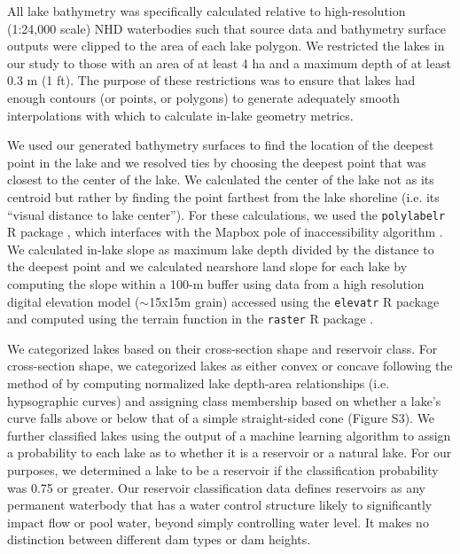 \documentclass[draft]{agujournal2019}
\begin{document}
All lake bathymetry was specifically calculated relative to high-resolution (1:24,000 scale) NHD \cite{usgsNationalHydrographyDataset2019} waterbodies such that source data and bathymetry surface outputs were clipped to the area of each lake polygon. We restricted the lakes in our study to those with an area of at least 4 ha and a maximum depth of at least 0.3 m (1 ft). The purpose of these restrictions was to ensure that lakes had enough contours (or points, or polygons) to generate adequately smooth interpolations with which to calculate in-lake geometry metrics.

We used our generated bathymetry surfaces to find the location of the deepest point in the lake and we resolved ties by choosing the deepest point that was closest to the center of the lake. We calculated the center of the lake not as its centroid but rather by finding the point farthest from the lake shoreline (i.e. its “visual distance to lake center”). For these calculations, we used the \texttt{polylabelr} R package \cite{larssonPolylabelrFindPole2019}, which interfaces with the Mapbox pole of inaccessibility algorithm \cite{agafonkinJSLibraryFinding2019}. We calculated in-lake slope as maximum lake depth divided by the distance to the deepest point and we calculated nearshore land slope for each lake by computing the slope within a 100-m buffer using data from a high resolution digital elevation model ($\sim$15x15m grain) accessed using the \texttt{elevatr} R package \cite{hollisterElevatrAccessElevation2017} and computed using the terrain function in the \texttt{raster} R package \cite{hijmansRasterGeographicData2019}.

We categorized lakes based on their cross-section shape and reservoir class. For cross-section shape, we categorized lakes as either convex or concave following the method of  by computing normalized lake depth-area relationships (i.e. hypsographic curves) and assigning class membership based on whether a lake’s curve falls above or below that of a simple straight-sided cone (Figure S3). We further classified lakes using the output of a machine learning algorithm to assign a probability to each lake as to whether it is a reservoir or a natural lake. For our purposes, we determined a lake to be a reservoir if the classification probability was 0.75 or greater. Our reservoir classification data defines reservoirs as any permanent waterbody that has a water control structure likely to significantly impact flow or pool water, beyond simply controlling water level. It makes no distinction between different dam types or dam heights.
\end{document}
